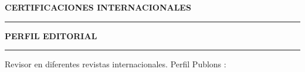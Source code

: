 \documentclass[10pt]{article}
\begin{document}
\vspace{0.3cm}
\textbf{CERTIFICACIONES INTERNACIONALES}
\vspace{3pt}
\hrule


\vspace{0.5cm}
\textbf{PERFIL EDITORIAL}
\vspace{3pt}
\hrule
Revisor en diferentes revistas internacionales. Perfil Publons \href{https://publons.com/author/1349368}{\faExternalLink}: 



%

\end{document}

